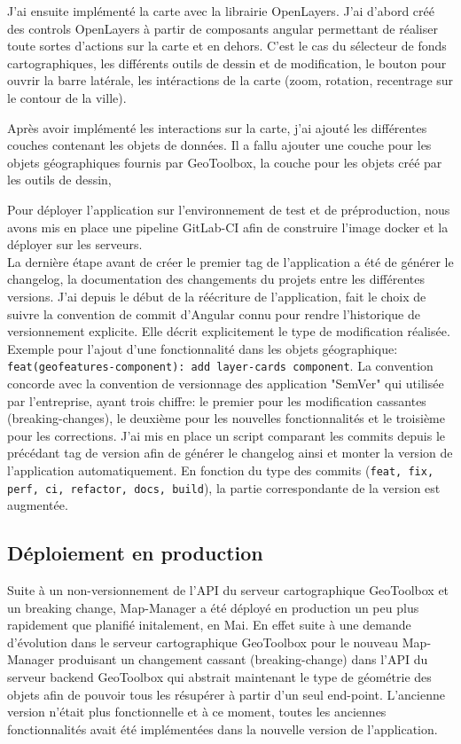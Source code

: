 \documentclass{rapportUHA40}
\begin{document}
J'ai ensuite implémenté la carte avec la librairie OpenLayers. J'ai d'abord
créé des controls OpenLayers à partir de composants angular permettant de
réaliser toute sortes d'actions sur la carte et en dehors. C'est le cas du
sélecteur de fonds cartographiques, les différents outils de dessin et de
modification, le bouton pour ouvrir la barre latérale, les intéractions de la
carte (zoom, rotation, recentrage sur le contour de la ville).

Après avoir implémenté les interactions sur la carte, j'ai ajouté les
différentes couches contenant les objets de données. Il a fallu ajouter une
couche pour les objets géographiques fournis par GeoToolbox, la couche pour les
objets créé par les outils de dessin,

Pour déployer l'application sur l'environnement de test et de préproduction,
nous avons mis en place une pipeline GitLab-CI afin de construire l'image
docker et la déployer sur les serveurs. \\

La dernière étape avant de créer le premier tag de l'application a été de
générer le changelog, la documentation des changements du projets entre les
différentes versions. J'ai depuis le début de la réécriture de l'application,
fait le choix de suivre la convention de commit d'Angular connu pour rendre
l'historique de versionnement explicite. Elle décrit explicitement le type de
modification réalisée. Exemple pour l'ajout d'une fonctionnalité dans les
objets géographique: \texttt{feat(geofeatures-component): add
  layer-cards component}. La convention concorde avec la convention de
versionnage des application "SemVer" qui utilisée par l'entreprise, ayant trois
chiffre: le premier pour les modification cassantes (breaking-changes), le
deuxième pour les nouvelles fonctionnalités et le troisième pour les
corrections. J'ai mis en place un script comparant les commits depuis le
précédant tag de version afin de générer le changelog ainsi et monter la
version de l'application automatiquement. En fonction du type des commits
(\texttt{feat, fix, perf, ci, refactor, docs, build}), la partie
correspondante de la version est augmentée.

\subsection{Déploiement en production}
Suite à un non-versionnement de l'API du serveur cartographique GeoToolbox et
un breaking change, Map-Manager a été déployé en production un peu plus
rapidement que planifié initalement, en Mai. En effet suite à une demande
d'évolution dans le serveur cartographique GeoToolbox pour le nouveau
Map-Manager produisant un changement cassant (breaking-change) dans l'API du
serveur backend GeoToolbox qui abstrait maintenant le type de géométrie des
objets afin de pouvoir tous les résupérer à partir d'un seul end-point.
L'ancienne version n'était plus fonctionnelle et à ce moment, toutes les
anciennes fonctionnalités avait été implémentées dans la nouvelle version de
l'application.
\end{document}
